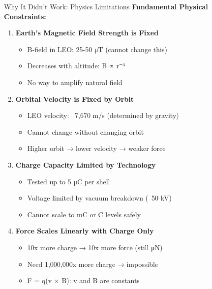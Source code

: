 \documentclass[aspectratio=169]{beamer}
\begin{document}
\begin{frame}{Why It Didn't Work: Physics Limitations}
\textbf{Fundamental Physical Constraints:}

\vspace{0.5em}
\begin{enumerate}
    \item \textbf{Earth's Magnetic Field Strength is Fixed}
    \begin{itemize}
        \item B-field in LEO: 25-50 μT (cannot change this)
        \item Decreases with altitude: B ∝ r⁻³
        \item No way to amplify natural field
    \end{itemize}

    \item \textbf{Orbital Velocity is Fixed by Orbit}
    \begin{itemize}
        \item LEO velocity: ~7,670 m/s (determined by gravity)
        \item Cannot change without changing orbit
        \item Higher orbit → lower velocity → weaker force
    \end{itemize}

    \item \textbf{Charge Capacity Limited by Technology}
    \begin{itemize}
        \item Tested up to 5 μC per shell
        \item Voltage limited by vacuum breakdown (~50 kV)
        \item Cannot scale to mC or C levels safely
    \end{itemize}

    \item \textbf{Force Scales Linearly with Charge Only}
    \begin{itemize}
        \item 10x more charge → 10x more force (still μN)
        \item Need 1,000,000x more charge → impossible
        \item F = q(v × B): v and B are constants
    \end{itemize}
\end{enumerate}
\end{frame}
\end{document}
